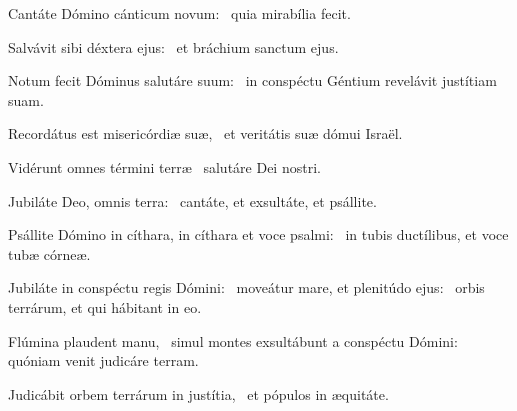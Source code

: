 \item Cantáte Dómino cánticum novum:~\psstar{} quia mirabília fecit.

\item Salvávit sibi déxtera ejus:~\psstar{} et bráchium sanctum ejus.

\item Notum fecit Dóminus salutáre suum:~\psstar{} in conspéctu Géntium revelávit justítiam suam.

\item Recordátus est misericórdiæ suæ,~\psstar{} et veritátis suæ dómui Israël.

\item Vidérunt omnes términi terræ~\psstar{} salutáre Dei nostri.

\item Jubiláte Deo, omnis terra:~\psstar{} cantáte, et exsultáte, et psállite.

\item Psállite Dómino in cíthara, in cíthara et voce psalmi:~\psstar{} in tubis ductílibus, et voce tubæ córneæ.

\item Jubiláte in conspéctu regis Dómini:~\pscross{} moveátur mare, et plenitúdo ejus:~\psstar{} orbis terrárum, et qui hábitant in eo.

\item Flúmina plaudent manu,~\pscross{} simul montes exsultábunt a conspéctu Dómini:~\psstar{} quóniam venit judicáre terram.

\item Judicábit orbem terrárum in justítia,~\psstar{} et pópulos in æquitáte.
